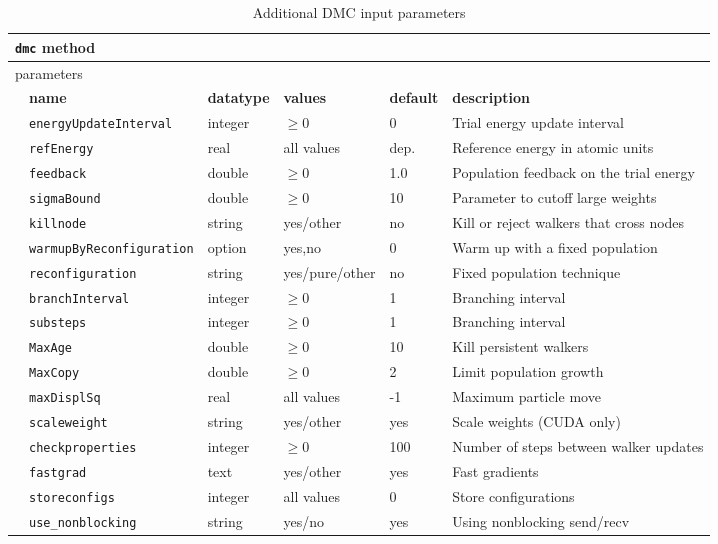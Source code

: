   \begin{table}[h]
    \begin{center}
      \caption{Additional DMC input parameters}
      \label{tab:dmcadditional}
      \begin{tabularx}{\textwidth}{l l l l l X }
    \hline
    \multicolumn{6}{l}{\texttt{dmc} method} \\
    \hline
    \multicolumn{2}{l}{parameters}  & \multicolumn{4}{l}{}\\    
   &   \bfseries name     & \bfseries datatype & \bfseries values & \bfseries default   & \bfseries description \\
   &   \texttt{energyUpdateInterval} &  integer  & $\ge 0$ & 0   & Trial energy update interval \\
   &   \texttt{refEnergy           } &  real     & all values & dep.   & Reference energy in atomic units  \\
   &   \texttt{feedback            } &  double   & $\ge 0$ & 1.0   & Population feedback on the trial energy \\
   &   \texttt{sigmaBound          } &  double   & $\ge 0$ & 10   & Parameter to cutoff large weights  \\
   &   \texttt{killnode            } &  string   & yes/other & no   & Kill or reject walkers that cross nodes  \\
   &   \texttt{warmupByReconfiguration} & option & yes,no  & 0   & Warm up with a fixed population  \\
   &   \texttt{reconfiguration     } &  string   & yes/pure/other & no   & Fixed population technique  \\
   &   \texttt{branchInterval      } &  integer  & $\ge 0$ & 1   & Branching interval \\
   &   \texttt{substeps            } &  integer  & $\ge 0$ & 1   & Branching interval \\
   &   \texttt{MaxAge              } &  double   & $\ge 0$ & 10   & Kill persistent walkers  \\
   &   \texttt{MaxCopy             } &  double   & $\ge 0$ & 2   & Limit population growth \\
   &   \texttt{maxDisplSq          } &  real     & all values & -1   & Maximum particle move  \\
   &   \texttt{scaleweight         } &  string   & yes/other & yes   & Scale weights (CUDA only)  \\
   &   \texttt{checkproperties     } &  integer  & $\ge 0$ & 100   & Number of steps between walker updates  \\
   &   \texttt{fastgrad            } &  text     & yes/other & yes   & Fast gradients  \\
   &   \texttt{storeconfigs        } &  integer  & all values & 0   & Store configurations  \\
   &   \texttt{use\_nonblocking    } &  string   & yes/no     & yes   & Using nonblocking send/recv \\
   \hline
  \end{tabularx}
  \end{center}
  \end{table}
